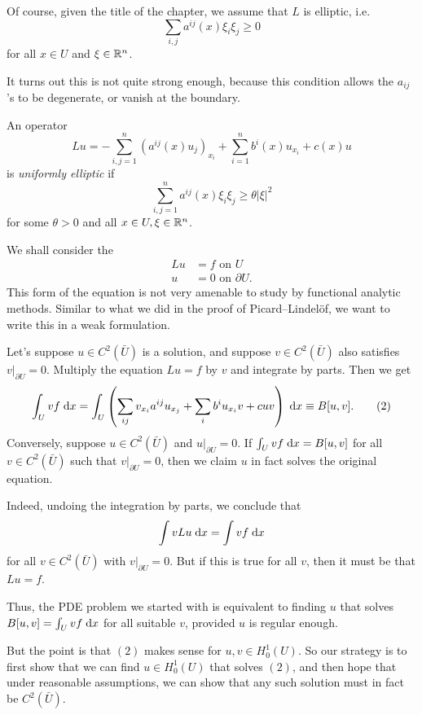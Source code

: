 \documentclass[a4paper]{article}
\begin{document}
Of course, given the title of the chapter, we assume that $L$ is elliptic, i.e.
\[
  \sum_{i, j} a^{ij}(x) \xi_i \xi_j \geq 0
\]
for all $x \in U$ and $\xi \in \mathbb{R}^n$.

It turns out this is not quite strong enough, because this condition allows the $a_{ij}$'s to be degenerate, or vanish at the boundary.

\begin{defi}
  An operator
  \[
    Lu = - \sum_{i, j = 1}^n (a^{ij}(x) u_j)_{x_i} + \sum_{i = 1}^n b^i(x) u_{x_i} + c(x) u
  \]
  is \emph{uniformly elliptic} if
  \[
    \sum_{i, j = 1}^n a^{ij}(x) \xi_i \xi_j \geq \theta |\xi|^2
  \]
  for some $\theta > 0$ and all $x \in U, \xi \in\mathbb{R}^n$.
\end{defi}

We shall consider the 
\begin{align*}
  Lu &= f \text{ on }U\\
  u &= 0 \text{ on }\partial U.
\end{align*}
This form of the equation is not very amenable to study by functional analytic methods. Similar to what we did in the proof of Picard--Lindel\"of, we want to write this in a weak formulation.

Let's suppose $u \in C^2(\bar{U})$ is a solution, and suppose $v \in C^2(\bar{U})$ also satisfies $v|_{\partial U} = 0$. Multiply the equation $Lu = f$ by $v$ and integrate by parts. Then we get
\[
  \int_U vf \;\mathrm{d} x = \int_U \left(\sum_{ij} v_{x_i} a^{ij} u_{x_j} + \sum_i b^i u_{x_i} v + c uv\right)\;\mathrm{d} x \equiv B[u, v].\tag{$2$}
\]
Conversely, suppose $u \in C^2(\bar{U})$ and $u|_{\partial U} = 0$. If $\int_U vf\;\mathrm{d} x = B[u, v]$ for all $v \in C^2(\bar{U})$ such that $v|_{\partial U} = 0$, then we claim $u$ in fact solves the original equation.

Indeed, undoing the integration by parts, we conclude that
\[
  \int v Lu \;\mathrm{d} x = \int v f\;\mathrm{d} x
\]
for all $v \in C^2(\bar{U})$ with $v|_{\partial U} = 0$. But if this is true for all $v$, then it must be that $Lu = f$.

Thus, the PDE problem we started with is equivalent to finding $u$ that solves $B[u, v] = \int_U v f\;\mathrm{d} x$ for all suitable $v$, provided $u$ is regular enough.

But the point is that $(2)$ makes sense for $u, v \in H_0^1(U)$. So our strategy is to first show that we can find $u \in H_0^1(U)$ that solves $(2)$, and then hope that under reasonable assumptions, we can show that any such solution must in fact be $C^2(\bar{U})$.
\end{document}
